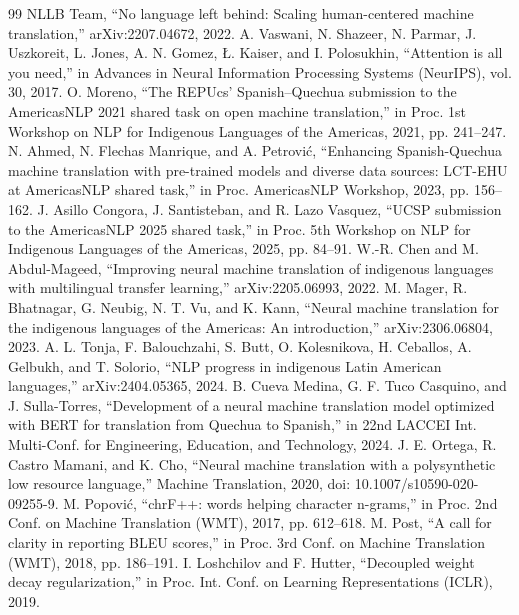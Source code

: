 \documentclass[conference]{IEEEtran}
\begin{document}
\begin{thebibliography}{99}
 NLLB Team, “No language left behind: Scaling human-centered machine translation,” arXiv:2207.04672, 2022.
 A. Vaswani, N. Shazeer, N. Parmar, J. Uszkoreit, L. Jones, A. N. Gomez, Ł. Kaiser, and I. Polosukhin, “Attention is all you need,” in Advances in Neural Information Processing Systems (NeurIPS), vol. 30, 2017.
 O. Moreno, “The REPUcs' Spanish–Quechua submission to the AmericasNLP 2021 shared task on open machine translation,” in Proc. 1st Workshop on NLP for Indigenous Languages of the Americas, 2021, pp. 241–247.
 N. Ahmed, N. Flechas Manrique, and A. Petrović, “Enhancing Spanish-Quechua machine translation with pre-trained models and diverse data sources: LCT-EHU at AmericasNLP shared task,” in Proc. AmericasNLP Workshop, 2023, pp. 156–162.
 J. Asillo Congora, J. Santisteban, and R. Lazo Vasquez, “UCSP submission to the AmericasNLP 2025 shared task,” in Proc. 5th Workshop on NLP for Indigenous Languages of the Americas, 2025, pp. 84–91.
 W.-R. Chen and M. Abdul-Mageed, “Improving neural machine translation of indigenous languages with multilingual transfer learning,” arXiv:2205.06993, 2022.
 M. Mager, R. Bhatnagar, G. Neubig, N. T. Vu, and K. Kann, “Neural machine translation for the indigenous languages of the Americas: An introduction,” arXiv:2306.06804, 2023.
 A. L. Tonja, F. Balouchzahi, S. Butt, O. Kolesnikova, H. Ceballos, A. Gelbukh, and T. Solorio, “NLP progress in indigenous Latin American languages,” arXiv:2404.05365, 2024.
 B. Cueva Medina, G. F. Tuco Casquino, and J. Sulla-Torres, “Development of a neural machine translation model optimized with BERT for translation from Quechua to Spanish,” in 22nd LACCEI Int. Multi-Conf. for Engineering, Education, and Technology, 2024.
 J. E. Ortega, R. Castro Mamani, and K. Cho, “Neural machine translation with a polysynthetic low resource language,” Machine Translation, 2020, doi: 10.1007/s10590-020-09255-9.
 M. Popović, “chrF++: words helping character n-grams,” in Proc. 2nd Conf. on Machine Translation (WMT), 2017, pp. 612–618.
 M. Post, “A call for clarity in reporting BLEU scores,” in Proc. 3rd Conf. on Machine Translation (WMT), 2018, pp. 186–191.
 I. Loshchilov and F. Hutter, “Decoupled weight decay regularization,” in Proc. Int. Conf. on Learning Representations (ICLR), 2019.
\end{thebibliography}
\end{document}
